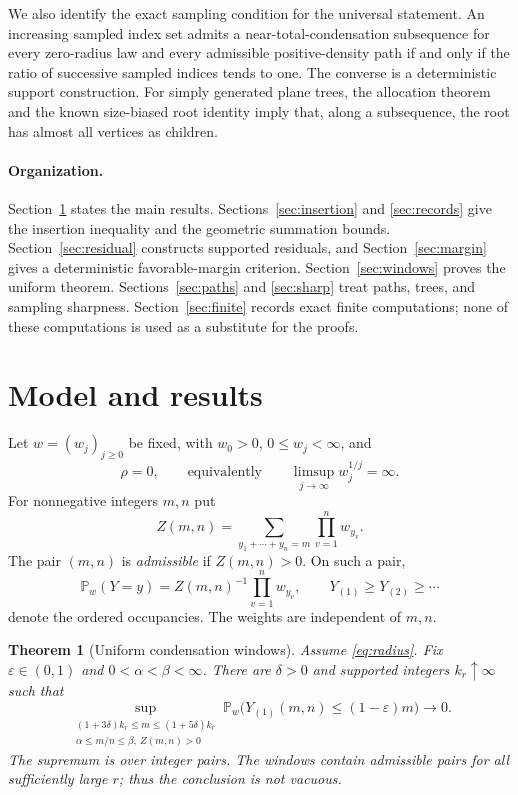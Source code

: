\documentclass[11pt]{amsart}
\newtheorem{theorem}{Theorem}[section]
\theoremstyle{remark}\newtheorem{remark}[theorem]{Remark}
\newcommand{\Pp}{\mathbb P}
\begin{document}
We also identify the exact sampling condition for the universal statement.
An increasing sampled index set admits a near-total-condensation
subsequence for every zero-radius law and every admissible positive-density
path if and only if the ratio of successive sampled indices tends to one.
The converse is a deterministic support construction. For simply generated
plane trees, the allocation theorem and the known size-biased root identity
imply that, along a subsequence, the root has almost all vertices as children.

\paragraph{Organization.}
Section~\ref{sec:results} states the main results. Sections~\ref{sec:insertion}
and \ref{sec:records} give the insertion inequality and the geometric
summation bounds. Section~\ref{sec:residual} constructs supported residuals,
and Section~\ref{sec:margin} gives a deterministic favorable-margin
criterion. Section~\ref{sec:windows} proves the uniform theorem.
Sections~\ref{sec:paths} and \ref{sec:sharp} treat paths, trees, and sampling
sharpness. Section~\ref{sec:finite} records exact finite computations; none
of these computations is used as a substitute for the proofs.


\section{Model and results}\label{sec:results}
Let $w=(w_j)_{j\ge0}$ be fixed, with $w_0>0$, $0\le w_j<\infty$, and
\begin{equation}\label{eq:radius}
 \rho=0,\qquad\text{equivalently}\qquad
 \limsup_{j\to\infty}w_j^{1/j}=\infty.
\end{equation}
For nonnegative integers $m,n$ put
\[
 Z(m,n)=\sum_{y_1+\cdots+y_n=m}\prod_{v=1}^n w_{y_v}.
\]
The pair $(m,n)$ is \emph{admissible} if $Z(m,n)>0$. On such a pair,
\[
 \Pp_w(Y=y)=Z(m,n)^{-1}\prod_{v=1}^n w_{y_v},
 \qquad Y_{(1)}\ge Y_{(2)}\ge\cdots
\]
denote the ordered occupancies. The weights are independent of $m,n$.

\begin{theorem}[Uniform condensation windows]\label{thm:windows}
Assume \eqref{eq:radius}. Fix $\varepsilon\in(0,1)$ and
$0<\alpha<\beta<\infty$. There are $\delta>0$ and supported integers
$k_r\uparrow\infty$ such that
\begin{equation}\label{eq:uniform}
 \sup_{\substack{(1+3\delta)k_r\le m\le(1+5\delta)k_r\\
                  \alpha\le m/n\le\beta,\ Z(m,n)>0}}
 \Pp_w\bigl(Y_{(1)}(m,n)\le(1-\varepsilon)m\bigr)
 \longrightarrow0.
\end{equation}
The supremum is over integer pairs. The windows contain admissible pairs
for all sufficiently large $r$; thus the conclusion is not vacuous.
\end{theorem}
\end{document}
